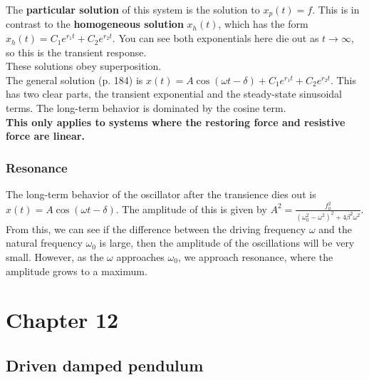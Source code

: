 \documentclass[a4paper, 11pt]{article}
\begin{document}
  The \textbf{particular solution} of this system is the solution to $x_p(t) = f$.
  This is in contrast to the \textbf{homogeneous solution} $x_h(t)$, which has
  the form $x_h(t) = C_1 e^{r_1 t} + C_2 e^{r_2 t}$. You can see both exponentials
  here die out as $t \rightarrow \infty$, so this is the transient response.\\

  These solutions obey superposition.\\

  The general solution (p. 184) is
  $x(t) = A\cos(\omega t - \delta) + C_1 e^{r_1 t} + C_2 e^{r_2 t}$. This has
  two clear parts, the transient exponential and the steady-state sinusoidal
  terms. The long-term behavior is dominated by the cosine term.\\

  \textbf{This only applies to systems where the restoring force and resistive
  force are linear.}\\



  \subsubsection{Resonance}

  The long-term behavior of the oscillator after the transience dies out is
  $x(t) = A\cos(\omega t - \delta)$. The amplitude of this is given by
  $A^2 = \frac{f_0^2}{(\omega_0^2 - \omega^2)^2 + 4\beta^2\omega^2}$.\\

  From this, we can see if the difference between the driving frequency $\omega$
  and the natural frequency $\omega_0$ is large,
  then the amplitude of the oscillations will be very small. However, as
  the $\omega$ approaches $\omega_0$, we approach resonance, where the amplitude
  grows to a maximum.



  \section*{Chapter 12}

  \subsection{Driven damped pendulum}
\end{document}
